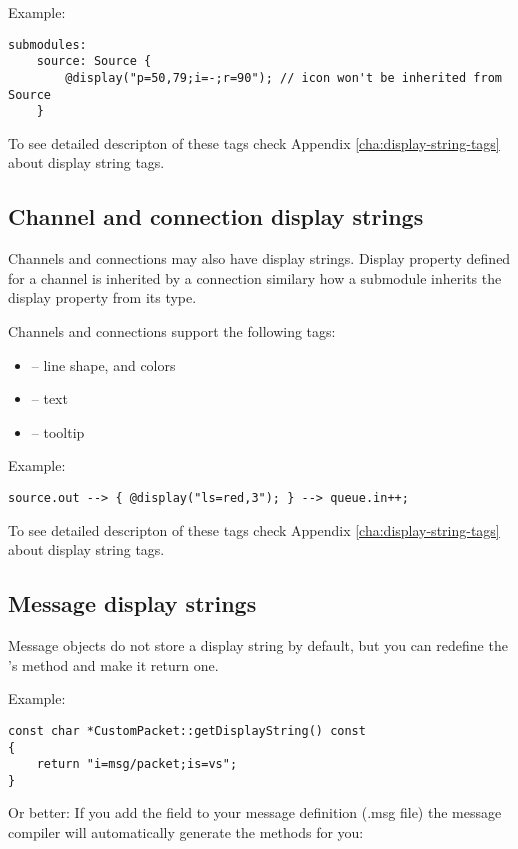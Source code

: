 Example:
\begin{verbatim}
submodules:
    source: Source {
        @display("p=50,79;i=-;r=90"); // icon won't be inherited from Source
    }
\end{verbatim}

To see detailed descripton of these tags check
Appendix \ref{cha:display-string-tags} about display string tags.

\subsection{Channel and connection display strings}

Channels and connections may also have display strings. Display property
defined for a channel is inherited by a connection similary how a submodule
inherits the display property from its type.

Channels and connections support the following tags:
\begin{itemize}
  \item{ -- line shape, and colors}
  \item{ -- text}
  \item{ -- tooltip}
\end{itemize}

Example:
\begin{verbatim}
source.out --> { @display("ls=red,3"); } --> queue.in++;
\end{verbatim}

To see detailed descripton of these tags check
Appendix \ref{cha:display-string-tags} about display string tags.

\subsection{Message display strings}

Message objects do not store a display string by default, but you can redefine
the 's  method and make it return
one.

Example:
\begin{verbatim}
const char *CustomPacket::getDisplayString() const
{
    return "i=msg/packet;is=vs";
}
\end{verbatim}

Or better: If you add the field  to your message 
definition (.msg file) the message compiler will automatically generate 
the  methods for you:

